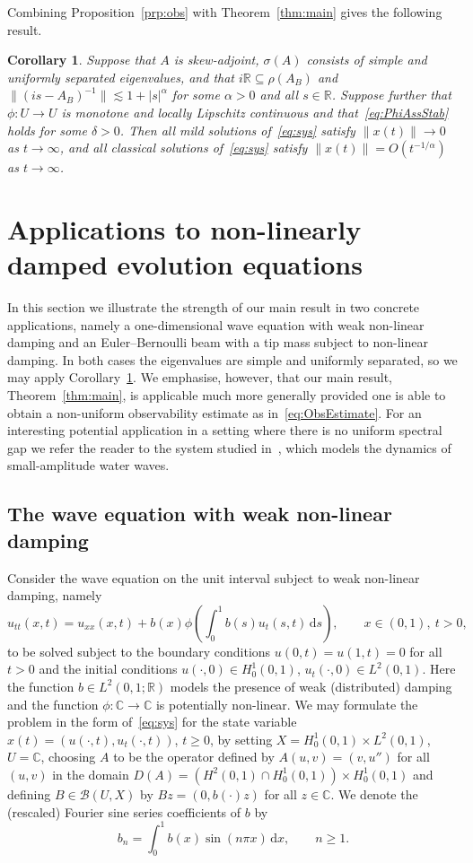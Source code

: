 \documentclass[11pt, a4paper]{amsart}
\newcommand{\dd}{\mathrm{d}}
\newcommand{\B}{\mathcal{B}}
\newcommand{\RR}{\mathbb{R}}
\newcommand{\CC}{\mathbb{C}}
\newcommand{\inv}{^{-1}}
\newtheorem{cor}[thm]{Corollary}
\theoremstyle{definition}
\numberwithin{equation}{section}
\begin{document}
Combining Proposition~\ref{prp:obs} with Theorem~\ref{thm:main} gives the following result.

\begin{cor}\label{cor:gap}
Suppose that $A$ is skew-adjoint,  $\sigma(A)$ consists of simple and uniformly separated eigenvalues,  and that $i\RR\subseteq\rho(A_B)$ and $\|(is-A_B)\inv\|\lesssim 1+|s|^\alpha$ for some $\alpha>0$ and all $s\in\RR$. Suppose further  that $\phi\colon U\to U$ is monotone and locally Lipschitz continuous and that~\eqref{eq:PhiAssStab} holds for some $\delta>0$.
Then all  mild solutions of~\eqref{eq:sys} satisfy $\|x(t)\|\to 0$ as $t\to\infty$, and all classical solutions of~\eqref{eq:sys} satisfy $\|x(t)\|= O(t^{-1/\alpha})$ as $t\to\infty$.
\end{cor}


\section{Applications to non-linearly damped evolution equations}\label{sec:app}
\label{sec:PDEs}

In this section we illustrate the strength of our main result in two concrete applications, namely a one-dimensional wave equation with weak non-linear damping and an Euler--Bernoulli beam  with a tip mass subject to non-linear damping. In both cases the eigenvalues are simple and uniformly separated, so we may apply Corollary~\ref{cor:gap}. We emphasise, however, that our main result, Theorem~\ref{thm:main}, is applicable much more generally provided one is able to obtain a non-uniform observability estimate as in~\eqref{eq:ObsEstimate}. For an interesting potential application in a setting where there is no uniform spectral gap we refer the reader to the system studied in~\cite{SuTuc20}, which models the dynamics of small-amplitude water waves.

\subsection{The wave equation with weak non-linear damping} Consider the wave equation on the unit interval subject to weak non-linear damping, namely
$$u_{tt}(x,t)=u_{xx}(x,t)+b(x)\phi\left(\int_0^1b(s)u_t(s,t)\,\dd s\right),\qquad x\in(0,1),\ t>0,$$
to be solved subject to the boundary conditions $u(0,t)=u(1,t)=0$ for all $t>0$ and the initial conditions  $u(\cdot,0)\in H_0^1(0,1)$, $u_t(\cdot,0)\in L^2(0,1)$. Here the function $b\in L^2(0,1;\RR)$ models the presence of weak (distributed) damping and the function $\phi\colon\CC\to\CC$ is potentially non-linear. We may formulate the problem in the form of~\eqref{eq:sys} for the state variable $x(t)=(u(\cdot,t),u_t(\cdot,t))$, $t\ge0$,  by setting $X=H_0^1(0,1)\times L^2(0,1)$, $U=\CC$, choosing $A$ to be the operator defined by $A(u,v)=(v,u'')$ for all $(u,v)$ in the domain $D(A)=(H^2(0,1)\cap H_0^1(0,1))\times H_0^1(0,1)$ and defining $B\in\B(U,X)$ by $Bz=(0,b(\cdot)z)$ for all $z\in\CC$. We denote the (rescaled) Fourier sine series coefficients of $b$ by
$$b_n=\int_0^1 b(x)\sin(n \pi x)\,\dd x,\qquad n\ge1.$$
\end{document}
